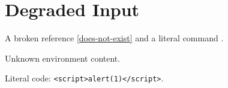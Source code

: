 \documentclass{article}
\begin{document}
\section{Degraded Input}\label{sec:degraded}
A broken reference \ref{does-not-exist} and a literal command .
\begin{mysteryenv}
Unknown environment content.
\end{mysteryenv}
Literal code: \verb|<script>alert(1)</script>|.
\end{document}
